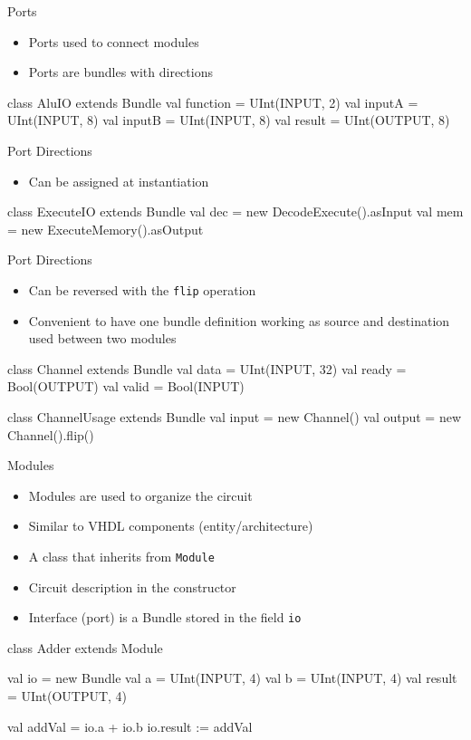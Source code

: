 \documentclass[xcolor=pdflatex,dvipsnames,table]{beamer}
\newcommand{\code}[1]{{\texttt{#1}}}
\begin{document}
\begin{frame}[fragile]{Ports}
\begin{itemize}
\item Ports used to connect modules
\item Ports are bundles with directions
\end{itemize}
\begin{chisel}
class AluIO extends Bundle {
  val function = UInt(INPUT, 2)
  val inputA = UInt(INPUT, 8)
  val inputB = UInt(INPUT, 8)
  val result = UInt(OUTPUT, 8)
}
\end{chisel}
\end{frame}

\begin{frame}[fragile]{Port Directions}
\begin{itemize}
\item Can be assigned at instantiation
\end{itemize}
\begin{chisel}
class ExecuteIO extends Bundle {
  val dec = new DecodeExecute().asInput
  val mem = new ExecuteMemory().asOutput
}
\end{chisel}
\begin{chisel}
\end{chisel}
\end{frame}

\begin{frame}[fragile]{Port Directions}
\begin{itemize}
\item Can be reversed with the \code{flip} operation
\item Convenient to have one bundle definition working as source
and destination used between two modules
\end{itemize}
\begin{chisel}
class Channel extends Bundle {
  val data = UInt(INPUT, 32)
  val ready = Bool(OUTPUT)
  val valid = Bool(INPUT)
}

class ChannelUsage extends Bundle {
  val input = new Channel()
  val output = new Channel().flip()
}
\end{chisel}
\end{frame}

\begin{frame}[fragile]{Modules}
\begin{itemize}
\item Modules are used to organize the circuit
\item Similar to VHDL components (entity/architecture)
\item A class that inherits from \code{Module}
\item Circuit description in the constructor
\item Interface (port) is a Bundle stored in the field \code{io}
\end{itemize}
\begin{chisel}
class Adder extends Module {
  val io = new Bundle {
    val a = UInt(INPUT, 4)
    val b = UInt(INPUT, 4)
    val result = UInt(OUTPUT, 4)
  }

  val addVal = io.a + io.b
  io.result := addVal
}
\end{chisel}
\end{frame}
\end{document}

